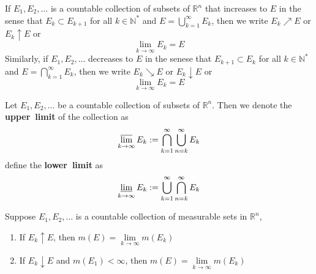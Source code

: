 \documentclass{ctexbook}
\begin{document}
\begin{define}
    If $E_1,E_2,\ldots$ is a countable collection of subsets of $\mathbb{R}^n$ that increases to $E$ in the sense that
    $E_k \subset E_{k+1}$ for all $k \in \mathbb{N}^*$ and $E = \bigcup\limits_{k=1}^\infty E_k$, then we write 
    $E_k \nearrow E$ or $E_k \uparrow E$ or \[\lim \limits_{k\rightarrow \infty}E_k = E\]
    Similarly, if $E_1,E_2,\ldots$ decreases to $E$ in the senese that $E_{k+1} \subset E_k$ for all $k \in \mathbb{N}^*$
    and $E = \bigcap\limits_{k=1}^{\infty}E_k$, then we write 
    $E_k \searrow E$ or $E_k \downarrow E$ or \[\lim \limits_{k\rightarrow \infty}E_k = E\]
\end{define}

\begin{define}
    Let $E_1, E_2,\ldots$ be a countable collection of subsets of $\mathbb{R}^n$. Then we denote the \textbf{upper~limit} of the
    collection as \[\varlimsup \limits_{k \rightarrow \infty} E_k := \bigcap\limits_{k=1}^\infty\bigcup\limits_{n=k}^\infty E_k \]
    define the \textbf{lower~limit} as
    \[\varliminf \limits_{k \rightarrow \infty} E_k := \bigcup\limits_{k=1}^\infty\bigcap\limits_{n=k}^\infty E_k \]
\end{define}

\begin{cor}
    Suppose $E_1,E_2,\ldots$ is a countable collection of measurable sets in $\mathbb{R}^n$,
    \begin{enumerate}
        \item If $E_k \uparrow E$, then $m(E)=\lim\limits_{k \rightarrow \infty} m(E_k)$
        \item If $E_k \downarrow E$ and $m(E_1)<\infty$, then $m(E) = \lim\limits_{k \rightarrow \infty} m(E_k)$
    \end{enumerate}
\end{cor}
\end{document}
